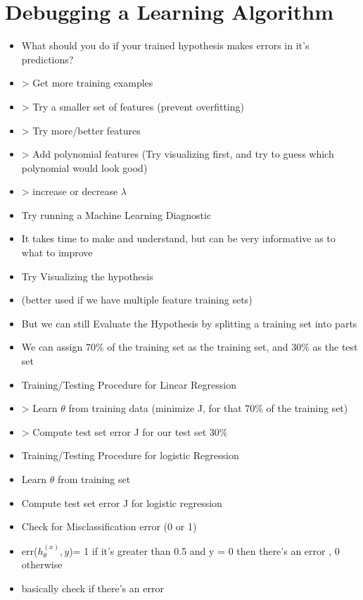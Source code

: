 \documentclass[]{article}
\begin{document}
	\section{Debugging a Learning Algorithm}
		\begin{itemize}
			\item What should you do if your trained hypothesis makes errors in it's predictions?
			\item > Get more training examples
			\item > Try a smaller set of features (prevent overfitting)
			\item > Try more/better features
			\item > Add polynomial features (Try visualizing first, and try to guess which polynomial would look good)
			\item > increase or decrease $\lambda$
			\\
			\item Try running a Machine Learning Diagnostic
			\item It takes time to make and understand, but can be very informative as to what to improve
			\\
			\item Try Visualizing the hypothesis
			\item (better used if we have multiple feature training sets)
			\item But we can still Evaluate the Hypothesis by splitting a training set into parts
			\item We can assign 70\% of the training set as the training set, and 30\% as the test set
			\\
			\item Training/Testing Procedure for Linear Regression
			\item > Learn $\theta$ from training data (minimize J, for that 70\% of the training set)
			\item > Compute test set error J for our test set 30\%
			\\
			\item Training/Testing Procedure for logistic Regression
			\item Learn $\theta$ from training set
			\item Compute test set error J for logistic regression
			\item Check for Misclassification error (0 or 1)
			\item err($h_\theta^{(x)},y$)= 1 if it's greater than 0.5 and y = 0 then there's an error , 0 otherwise
			\item basically check if there's an error

\end{itemize}
\end{document}
